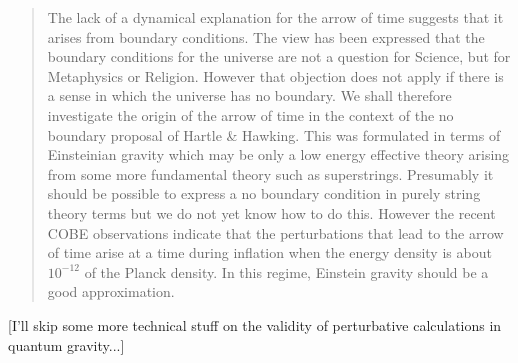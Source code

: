 \begin{quote}
The lack of a dynamical explanation for the arrow of time suggests that it arises from boundary conditions. The view has been expressed that the boundary conditions for the universe are not a question for Science, but for Metaphysics or Religion. However that objection does not apply if there is a sense in which the universe has no boundary. We shall therefore investigate the origin of the arrow of time in the context of the no boundary proposal of Hartle \& Hawking. This was formulated in terms of Einsteinian gravity which may be only a low energy effective theory arising from some more fundamental theory such as superstrings. Presumably it should be possible to express a no boundary condition in purely string theory terms but we do not yet know how to do this. However the recent COBE observations indicate that the perturbations that lead to the arrow of time arise at a time during inflation when the energy density is about $10^{-12}$ of the Planck density. In this regime, Einstein gravity should be a good approximation.
\end{quote}

[I'll skip some more technical stuff on the validity of perturbative calculations in quantum gravity...]

